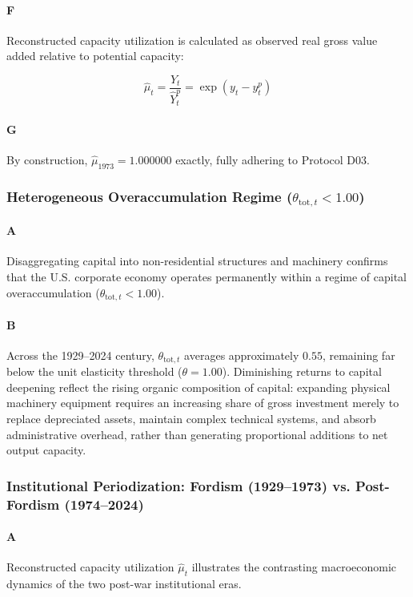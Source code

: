 \paragraph{F}
Reconstructed capacity utilization is calculated as observed real gross value added relative to potential capacity:

\[\hat{\mu}_t = \frac{Y_t}{\hat{Y}_t^p} = \exp(y_t - y_t^p)\]

\paragraph{G}
By construction, $\hat{\mu}_{1973} = 1.000000$ exactly, fully adhering to Protocol D03.

\subsubsection{Heterogeneous Overaccumulation Regime ($\theta_{\text{tot},t} < 1.00$)}

\paragraph{A}
Disaggregating capital into non-residential structures and machinery confirms that the U.S. corporate economy operates permanently within a regime of capital overaccumulation ($\theta_{\text{tot},t} < 1.00$).

\paragraph{B}
Across the 1929–2024 century, $\theta_{\text{tot},t}$ averages approximately $0.55$, remaining far below the unit elasticity threshold ($\theta = 1.00$). Diminishing returns to capital deepening reflect the rising organic composition of capital: expanding physical machinery equipment requires an increasing share of gross investment merely to replace depreciated assets, maintain complex technical systems, and absorb administrative overhead, rather than generating proportional additions to net output capacity.

\subsubsection{Institutional Periodization: Fordism (1929–1973) vs. Post-Fordism (1974–2024)}

\paragraph{A}
Reconstructed capacity utilization $\hat{\mu}_t$ illustrates the contrasting macroeconomic dynamics of the two post-war institutional eras.

